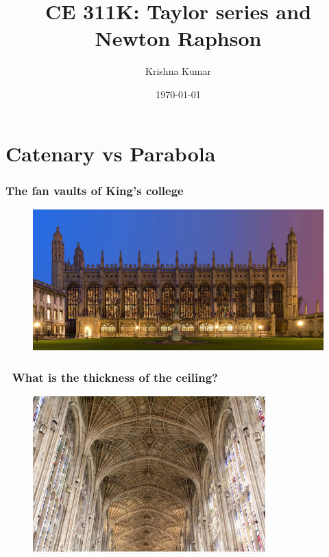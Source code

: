 \documentclass[notes]{beamer}
\title[CE 311K: Taylor series]{CE 311K: Taylor series and Newton Raphson}
\author{Krishna Kumar} %
\institute[UT Austin] %
{
University of Texas at Austin \\
\medskip
\href{mailto:krishnak@utexas.edu}{krishnak@utexas.edu} %
}
\date{\today} %
\begin{document}
\begin{frame}
\titlepage %
\end{frame}

\newif\ifshowtoc
\showtoctrue%

\AtBeginSection{%
	\ifshowtoc
	\begin{frame}
		\tableofcontents[currentsection, subsectionstyle=show/show/hide]
	\end{frame}
	\fi
}


\section{Catenary vs Parabola}
\begin{frame}
	\frametitle{The fan vaults of King's college}
	\begin{figure}[ht]
		\centering
		\includegraphics[width=\textwidth]{figs/kings.jpg}
	\end{figure}
\end{frame}


\begin{frame}
	\frametitle{\faQuestionCircleO~What is the thickness of the ceiling?}
	\begin{figure}[ht]
		\centering
		\includegraphics[width=0.8\textwidth]{figs/fanvaults.jpg}
	\end{figure}
\end{frame}
\end{document}
